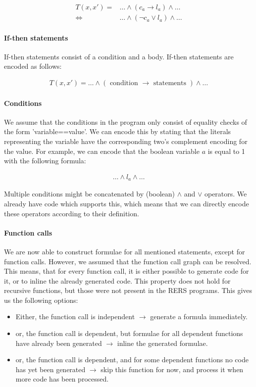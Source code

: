 \documentclass[a4paper]{article}
\begin{document}
\begin{align*}
T(x,x') =& \ldots \land (c_a \rightarrow l_a) \land \ldots\\
\Leftrightarrow& \ldots \land (\lnot c_a \lor l_a) \land \ldots
\end{align*}

\paragraph{If-then statements}
If-then statements consist of a condition and a body. If-then statements are encoded as follows:

\begin{align*}
T(x,x') = \ldots \land (\text{ condition } \rightarrow \text{ statements }) \land \ldots
\end{align*}

\paragraph{Conditions}
We assume that the conditions in the program only consist of equality checks of the form 'variable==value'. We can encode this by stating that the literals representing the variable have the corresponding two's complement encoding for the value. For example, we can encode that the boolean variable $a$ is equal to 1 with the following formula:

\begin{align*}
\ldots \land l_a \land \ldots
\end{align*}

Multiple conditions might be concatenated by (boolean) $\land$ and $\lor$ operators. We already have code which supports this, which means that we can directly encode these operators according to their definition.

\paragraph{Function calls}
We are now able to construct formulae for all mentioned statements, except for function calls. However, we assumed that the function call graph can be resolved. This means, that for every function call, it is either possible to generate code for it, or to inline the already generated code. This property does not hold for recursive functions, but those were not present in the RERS programs. This gives us the following options:

\begin{itemize}
\item Either, the function call is independent $\rightarrow$ generate a formula immediately.
\item or, the function call is dependent, but formulae for all dependent functions have already been generated $\rightarrow$ inline the generated formulae.
\item or, the function call is dependent, and for some dependent functions no code has yet been generated $\rightarrow$ skip this function for now, and process it when more code has been processed.
\end{itemize}
\end{document}
